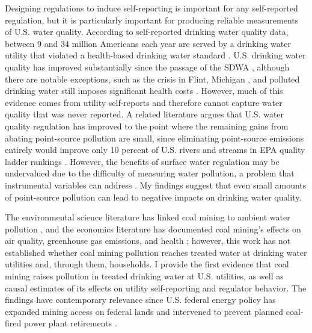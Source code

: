 \documentclass[12pt]{article}
\begin{document}
Designing regulations to induce self-reporting is important for any self-reported regulation, but it is particularly important for producing reliable measurements of U.S. water quality. According to self-reported drinking water quality data, between 9 and 34 million Americans each year are served by a drinking water utility that violated a health-based drinking water standard \parencite{allaire2018national}. U.S. drinking water quality has improved substantially since the passage of the SDWA \parencite{keiser2026water}, although there are notable exceptions, such as the crisis in Flint, Michigan \parencite{christensen2023flint}, and polluted drinking water still imposes significant health costs \parencite{hill2017shale, keiser2019us, disalvo2024drinking, marcus2025testing}. However, much of this evidence comes from utility self-reports and therefore cannot capture water quality that was never reported. A related literature argues that U.S. water quality regulation has improved to the point where the remaining gains from abating point-source pollution are small, since eliminating point-source emissions entirely would improve only 10 percent of U.S. rivers and streams in EPA quality ladder rankings \parencite{bingham2000}. However, the benefits of surface water regulation may be undervalued due to the difficulty of measuring water pollution, a problem that instrumental variables can address \parencite{keiser2019missing}. My findings suggest that even small amounts of point-source pollution can lead to negative impacts on drinking water quality.

The environmental science literature has linked coal mining to ambient water pollution \parencite{skousen2019acid, akcil2006acid}, and the economics literature has documented coal mining's effects on air quality, greenhouse gas emissions, and health \parencite{muller2011environmental, parfitt2024there}; however, this work has not established whether coal mining pollution reaches treated water at drinking water utilities and, through them, households. I provide the first evidence that coal mining raises pollution in treated drinking water at U.S. utilities, as well as causal estimates of its effects on utility self-reporting and regulator behavior. The findings have contemporary relevance since U.S. federal energy policy has expanded mining access on federal lands and intervened to prevent planned coal-fired power plant retirements \parencite{Trump2025EO14260, Trump2025EO14261, Trump2025Proc10914, Daly2025CoalMining}.
\end{document}
